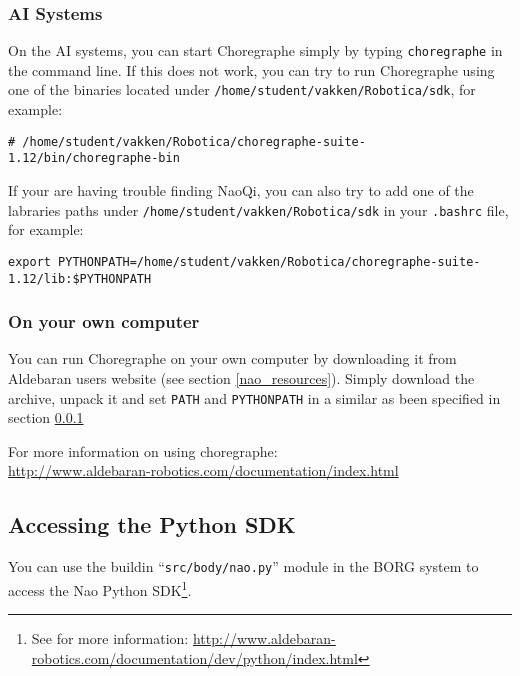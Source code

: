 \documentclass[a4paper, 10pt]{article}
\begin{document}
\subsubsection{AI Systems}
\label{choregraphe_ai_systems}

On the AI systems, you can start Choregraphe simply by typing \lstinline{choregraphe} in the command line.
If this does not work, you can try to run Choregraphe using one of the binaries located under \lstinline{/home/student/vakken/Robotica/sdk}, for example:
\begin{lstlisting}
# /home/student/vakken/Robotica/choregraphe-suite-1.12/bin/choregraphe-bin
\end{lstlisting}

If your are having trouble finding NaoQi, you can also try to add one of the labraries paths under \lstinline{/home/student/vakken/Robotica/sdk} in your \lstinline{.bashrc} file, for example:
\begin{lstlisting}
export PYTHONPATH=/home/student/vakken/Robotica/choregraphe-suite-1.12/lib:$PYTHONPATH
\end{lstlisting}

\subsubsection{On your own computer}

You can run Choregraphe on your own computer by downloading it from Aldebaran users website (see section \ref{nao_resources}).
Simply download the archive, unpack it and set \lstinline{PATH} and \lstinline{PYTHONPATH} in a similar as been specified in section \ref{choregraphe_ai_systems}

For more information on using choregraphe: \\
\url{http://www.aldebaran-robotics.com/documentation/index.html}



\subsection{Accessing the Python SDK}

You can use the buildin ``\lstinline{src/body/nao.py}'' module in the BORG system to access the Nao Python SDK\footnote{See for more information: \url{http://www.aldebaran-robotics.com/documentation/dev/python/index.html}}.
\end{document}
